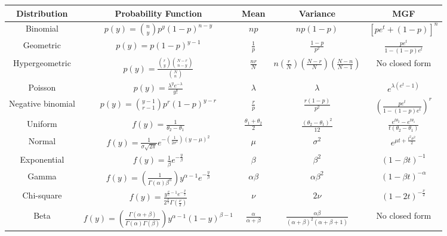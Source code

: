 \documentclass[10pt,landscape]{article}
\begin{document}
          \begin{tabularx}{\textwidth}{c c c c c}
            \hline Distribution & Probability Function & Mean &
            Variance & MGF
            \\ \hline Binomial & $p(y)=\binom{n}{y}p^y(1-p)^{n-y}$ &
            $np$ & $np(1-p)$ & $[pe^t+(1-p)]^n$
            \\ Geometric & $p(y) = p(1-p)^{y-1}$ & $\frac{1}{p}$ &
            $\frac{1-p}{p^2}$ & $\frac{pe^t}{1-(1-p)e^t}$
            \\ Hypergeometric & $p(y) = \frac{\binom{r}{y}
              \binom{N-r}{n-y}}{\binom{N}{n}}$ & $\frac{nr}{N}$ & $n
            \left(\frac{r}{N}\right) \left(\frac{N-r}{N}\right)
            \left(\frac{N-n}{N-1}\right) $ & No closed form
            \\ Poisson & $p(y) = \frac{\lambda^y e^{-\lambda}}{y!}$ &
            $\lambda$ & $\lambda$ & $e^{\lambda(e^t-1)}$
            \\ Negative binomial & $p(y) = \binom{y-1}{r-1} p^r
            (1-p)^{y-r}$ & $\frac{r}{p}$ & $\frac{r(1-p)}{p^2}$ &
            $\left(\frac{pe^t}{1-(1-p)e^t}\right)^r$
            \\ \hline Uniform & $f(y) = \frac{1}{\theta_2 - \theta_1}$
            & $\frac{\theta_1+\theta_2}{2}$ &
            $\frac{(\theta_2-\theta_1)^2}{12}$ & $\frac{e^{t
                \theta_2}-e^{t \theta_1}}{t(\theta_2 - \theta_1)}$
            \\ Normal & $f(y) = \frac{1}{\sigma \sqrt{2\pi}}e^{-
              \left(\frac{1}{2\sigma^2}\right)(y-\mu)^2}$ & $\mu$ &
            $\sigma^2$ & $e^{\mu t + \frac{t^2 \sigma^2}{2}}$
            \\ Exponential & $f(y) =
            \frac{1}{\beta}e^{-\frac{y}{\beta}}$ & $\beta$ & $\beta^2$
            & $(1-\beta t)^{-1}$
            \\ Gamma & $f(y)=
            \left(\frac{1}{\Gamma(\alpha)\beta^\alpha}\right)y^{\alpha
              - 1}e^{-\frac{y}{\beta}}$ & $\alpha \beta$ & $\alpha
            \beta^2$ & $(1-\beta t)^{-\alpha}$
            \\ Chi-square & $f(y) =
            \frac{y^{\frac{\nu}{2}-1}e^{-\frac{y}{2}}}{2^{\frac{\nu}{2}}\Gamma(\frac{\nu}{2})}$
            & $\nu$ & $2 \nu$ & $(1-2t)^{-\frac{\nu}{2}}$
            \\ Beta & $f(y)= \left(\frac{\Gamma(\alpha +
                \beta)}{\Gamma(\alpha)\Gamma(\beta)}\right)y^{\alpha-1}(1-y)^{\beta
              - 1}$ & $\frac{\alpha}{\alpha + \beta}$ & $\frac{\alpha
              \beta}{(\alpha+\beta)^2(\alpha+\beta+1)}$ & No closed form
          \end{tabularx}
\end{document}
